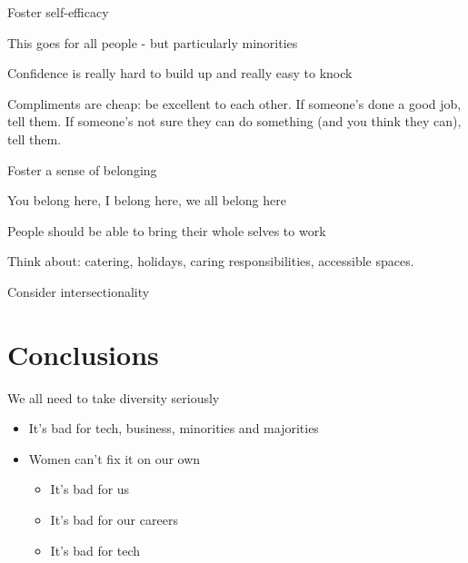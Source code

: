 \documentclass[xcolor=table,aspectratio=169]{beamer}
\begin{document}
\begin{frame}{Foster self-efficacy}

	This goes for all people - but particularly minorities

	\vspace{0.5em}

	Confidence is really hard to build up and really easy to knock

	\vspace{0.5em}

	Compliments are cheap: be excellent to each other. If someone's done a good job, tell them. If someone's not sure they can do something (and you think they can), tell them.

\end{frame}
\begin{frame}{Foster a sense of belonging}

	You belong here, I belong here, we all belong here 

	\vspace{0.5em}

	People should be able to bring their whole selves to work

	\vspace{0.5em}

Think about: catering, holidays, caring responsibilities, accessible spaces. 
\end{frame}

\begin{frame}{Consider intersectionality}
\end{frame}

\section{Conclusions}
	\begin{frame}{We all need to take diversity seriously}
		\begin{itemize}
		\item It's bad for tech, business, minorities and majorities 
		\item Women can't fix it on our own
		\begin{itemize}
			\item It's bad for us
			\item It's bad for our careers
			\item It's bad for tech
		\end{itemize}
	\end{itemize}
	\end{frame}
\end{document}
